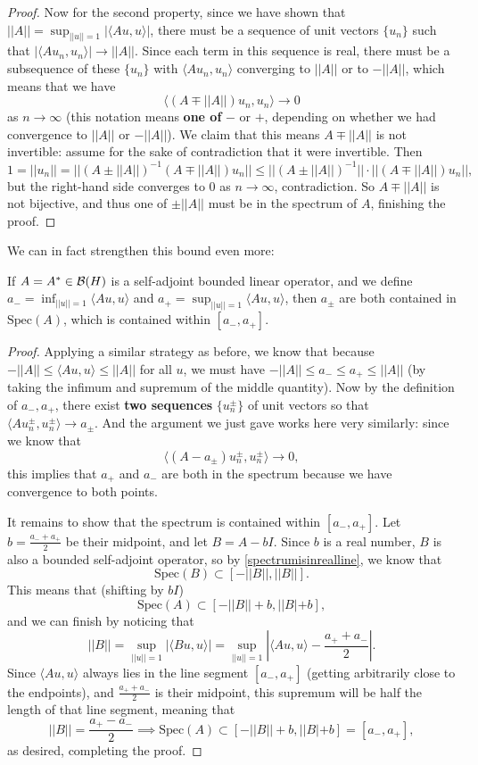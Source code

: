 \begin{proof}
Now for the second property, since we have shown that $||A|| = \sup_{||u|| = 1} |\langle Au, u \rangle|$, there must be a sequence of unit vectors $\{u_n\}$ such that $|\langle Au_n, u_n \rangle| \to ||A||$. Since each term in this sequence is real, there must be a subsequence of these $\{u_n\}$ with $\langle Au_n, u_n\rangle$ converging to $||A||$ or to $-||A||$, which means that we have 
\[
    \langle (A \mp ||A||)u_n, u_n \rangle \to 0
\]  
as $n \to \infty$ (this notation means \textbf{one of} $-$ or $+$, depending on whether we had convergence to $||A||$ or $-||A||$). We claim that this means $A \mp ||A||$ is not invertible: assume for the sake of contradiction that it were invertible. Then
\[
    1 = ||u_n|| = ||(A \pm ||A||)^{-1} (A \mp ||A||) u_n|| \le ||(A \pm ||A||)^{-1}|| \cdot ||(A \mp ||A||) u_n||,
\]
but the right-hand side converges to $0$ as $n \to \infty$, contradiction. So $A \mp ||A||$ is not bijective, and thus one of $\pm ||A||$ must be in the spectrum of $A$, finishing the proof. 
\end{proof}

We can in fact strengthen this bound even more:

\begin{theorem}
If $A = A^\ast \in \mathcal{B}(H)$ is a self-adjoint bounded linear operator, and we define $a_- = \inf_{||u|| = 1} \langle Au, u \rangle$ and $a_+ = \sup_{||u|| = 1} \langle Au, u \rangle$, then $a_{\pm}$ are both contained in $\text{Spec}(A)$, which is contained within $[a_-, a_+]$. 
\end{theorem}
\begin{proof}
Applying a similar strategy as before, we know that because $-||A|| \le \langle Au, u \rangle \le ||A||$ for all $u$, we must have $-||A|| \le a_- \le a_+ \le ||A||$ (by taking the infimum and supremum of the middle quantity). Now by the definition of $a_-, a_+$, there exist \textbf{two sequences} $\{u_n^{\pm}\}$ of unit vectors so that $\langle Au_n^{\pm}, u_n^{\pm} \rangle \to a_{\pm}$. And the argument we just gave works here very similarly: since we know that
\[
    \langle (A - a_{\pm}) u_n^{\pm}, u_n^{\pm} \rangle \to 0,
\]
this implies that $a_+$ and $a_-$ are both in the spectrum because we have convergence to both points. 

It remains to show that the spectrum is contained within $[a_-, a_+]$. Let $b = \frac{a_- + a_+}{2}$ be their midpoint, and let $B = A - bI$. Since $b$ is a real number, $B$ is also a bounded self-adjoint operator, so by \cref{spectrumisinrealline}, we know that
\[
    \text{Spec}(B) \subset [-||B||, ||B||].
\]
This means that (shifting by $bI$)
\[
    \text{Spec}(A) \subset[-||B|| + b, ||B| + b],
\]
and we can finish by noticing that
\[
    ||B|| = \sup_{||u|| = 1} |\langle Bu, u \rangle| = \sup_{||u|| = 1} \left|\langle Au, u \rangle - \frac{a_+ + a_-}{2}\right|.
\]
Since $\langle Au, u \rangle$ always lies in the line segment $[a_-, a_+]$ (getting arbitrarily close to the endpoints), and $\frac{a_+ + a_-}{2}$ is their midpoint, this supremum will be half the length of that line segment, meaning that
\[
    ||B|| = \frac{a_+ - a_-}{2} \implies \text{Spec}(A) \subset[-||B|| + b, ||B| + b] = [a_-, a_+],
\]  
as desired, completing the proof.
\end{proof}

